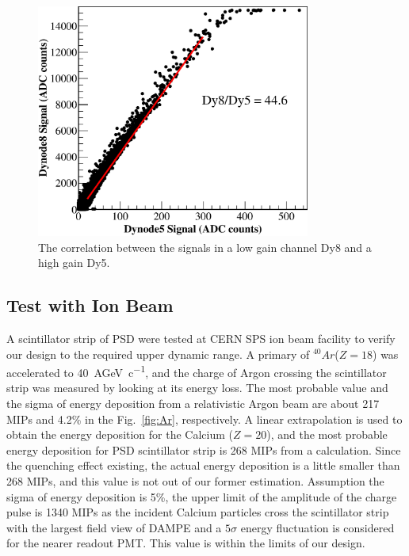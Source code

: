 \documentclass[5p, times]{elsarticle}
\begin{document}
\begin{figure}
 \centering
 \includegraphics[width=90mm]{dy58}
\caption{The correlation between the signals in a low gain channel Dy8 and a high gain Dy5.}
\label{fig:dy58}
\end{figure} 

\subsection{Test with Ion Beam}
\label{sec:beam}

A scintillator strip of PSD were tested at CERN SPS ion beam facility to verify our design to the required upper dynamic range. 
A primary of $^{40}Ar$($Z=18$) was accelerated to \SI{40}{AGeV\per c}, and the charge of Argon crossing the scintillator strip was measured by looking at its energy loss. 
The most probable value and the sigma of energy deposition from a relativistic Argon beam are about 217 MIPs and 4.2\% in the Fig.~\ref{fig:Ar}, respectively. 
A linear extrapolation is used to obtain the energy deposition for the Calcium ($Z=20$), and the most probable energy deposition for PSD scintillator strip is 268 MIPs from a calculation. 
Since the quenching effect existing, the actual energy deposition is a little smaller than 268 MIPs, and this value is not out of our former estimation. 
Assumption the sigma of energy deposition is 5\%, the upper limit of the amplitude of the charge pulse is 1340 MIPs as the incident Calcium particles cross the scintillator strip with the largest field view of DAMPE and a $5\sigma$ energy fluctuation is considered for the nearer readout PMT. 
This value is within the limits of our design.
\end{document}
